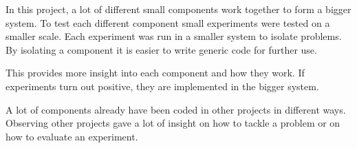 
In this project, a lot of different small components work together to form
a bigger system. To test each different component small experiments were tested on a 
smaller scale. Each experiment was run in a smaller system to isolate problems. By isolating a component
it is easier to write generic code for further use.

This provides more insight into each component and how they work. If experiments turn out positive, 
they are implemented in the bigger system.


A lot of components already have been coded in other projects in different ways. Observing
other projects gave a lot of insight on how to tackle a problem or on how to evaluate an experiment. 





